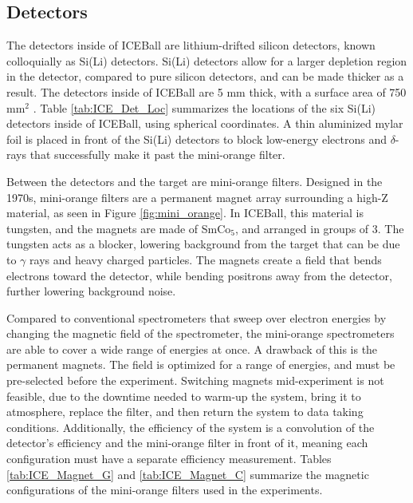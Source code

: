 \subsection{Detectors}

The detectors inside of ICEBall are lithium-drifted silicon detectors, known colloquially as Si(Li) detectors. Si(Li) detectors allow for a larger depletion region in the detector, compared to pure silicon detectors, and can be made thicker as a result. The detectors inside of ICEBall are 5 mm thick, with a surface area of 750 mm$^2$ \citep{metlay93:_iceball_comm}. Table \ref{tab:ICE_Det_Loc} summarizes the locations of the six Si(Li) detectors inside of ICEBall, using spherical coordinates. A thin aluminized mylar foil is placed in front of the Si(Li) detectors to block low-energy electrons and $\delta$-rays that successfully make it past the mini-orange filter.



Between the detectors and the target are mini-orange filters. Designed in the 1970s, mini-orange filters are a permanent magnet array surrounding a high-Z material, as seen in Figure \ref{fig:mini_orange}. In ICEBall, this material is tungsten, and the magnets are made of SmCo$_5$, and arranged in groups of 3. The tungsten acts as a blocker, lowering background from the target that can be due to $\gamma$ rays and heavy charged particles. The magnets create a field that bends electrons toward the detector, while bending positrons away from the detector, further lowering background noise. 



Compared to conventional spectrometers that sweep over electron energies by changing the magnetic field of the spectrometer, the mini-orange spectrometers are able to cover a wide range of energies at once. A drawback of this is the permanent magnets. The field is optimized for a range of energies, and must be pre-selected before the experiment. Switching magnets mid-experiment is not feasible, due to the downtime needed to warm-up the system, bring it to atmosphere, replace the filter, and then return the system to data taking conditions. Additionally, the efficiency of the system is a convolution of the detector's efficiency and the mini-orange filter in front of it, meaning each configuration must have a separate efficiency measurement. Tables \ref{tab:ICE_Magnet_G} and \ref{tab:ICE_Magnet_C} summarize the magnetic configurations of the mini-orange filters used in the experiments.

